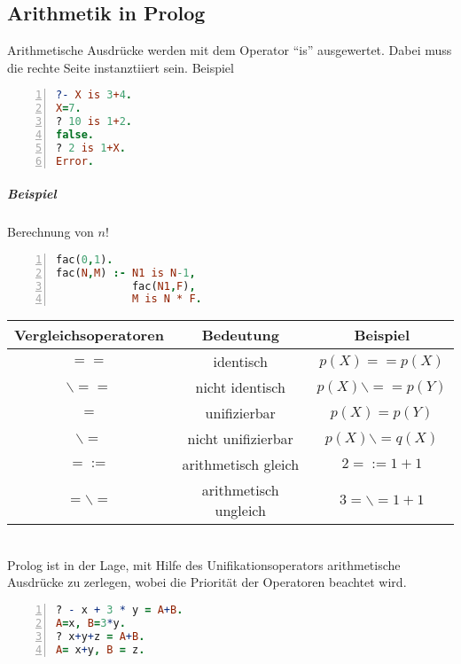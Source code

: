 \documentclass[a4paper]{scrartcl}
\begin{document}
\subsection{Arithmetik in Prolog}
Arithmetische Ausdrücke werden mit dem Operator "`is"' ausgewertet. Dabei muss die rechte Seite instanztiiert sein. Beispiel
\begin{lstlisting}[numbers=left, tabsize=4, language=Prolog]
?- X is 3+4.
X=7.
? 10 is 1+2.
false.
? 2 is 1+X.
Error.
\end{lstlisting}
\subparagraph{Beispiel} Berechnung von $n!$
\begin{lstlisting}[numbers=left, tabsize=4, language=Prolog]
fac(0,1).
fac(N,M) :- N1 is N-1,
            fac(N1,F),
            M is N * F.
\end{lstlisting}
\begin{tabular}{c|c|c}
Vergleichsoperatoren & Bedeutung & Beispiel\\ \hline
$==$ & identisch & $p(X) == p(X)$\\
$\backslash ==$ & nicht identisch & $p(X) \backslash == p(Y)$ \\
$=$ & unifizierbar & $p(X) = p(Y)$ \\
$\backslash = $ & nicht unifizierbar & $p(X) \backslash = q(X)$\\
$=:=$ & arithmetisch gleich & $2 =:= 1+1$\\
$= \backslash =$ & arithmetisch ungleich & $3 = \backslash = 1+1$\\
\end{tabular}\\
Prolog ist in der Lage, mit Hilfe des Unifikationsoperators arithmetische Ausdrücke zu zerlegen, wobei die Priorität der Operatoren beachtet wird.
\begin{lstlisting}[numbers=left, tabsize=4, language=Prolog]
? - x + 3 * y = A+B.
A=x, B=3*y.
? x+y+z = A+B.
A= x+y, B = z.
\end{lstlisting}
\end{document}

